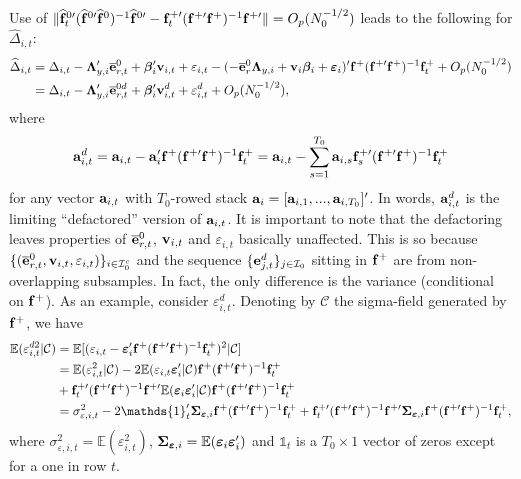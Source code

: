 \documentclass[12pt,fleqn]{article}
\begin{document}
Use of $\|\widehat{\mathbf{f}}_t^{0\prime}(\widehat{\mathbf{f}}^{0\prime}\widehat{\mathbf{f}}^0)^{-1}\widehat{\mathbf{f}}^{0\prime} - \mathbf{f}_t^{+\prime}(\mathbf{f}^{+\prime}\mathbf{f}^+)^{-1}\mathbf{f}^{+\prime}\| = O_p(N_0^{-1/2})$ leads to the following for $\widehat \Delta_{i,t}$:
\begin{align}
\widehat \Delta_{i,t} & = \Delta_{i,t} - \boldsymbol{\Lambda}_{y,i}'\overline{\mathbf{e}}_{r,t}^0 + \boldsymbol{\beta}_i'\mathbf{v}_{i,t} + \varepsilon_{i,t}  - ( - \overline{\mathbf{e}}_{r}^0\boldsymbol{\Lambda}_{y,i} + \mathbf{v}_i\boldsymbol{\beta}_i+  \boldsymbol{\varepsilon}_{i} )'  \mathbf{f}^{+} (\mathbf{f}^{+\prime}\mathbf{f}^+)^{-1}\mathbf{f}_t^+ + O_p(N_0^{-1/2})\notag\\
& = \Delta_{i,t} - \boldsymbol{\Lambda}_{y,i}'\overline{\mathbf{e}}_{r,t}^{0d} + \boldsymbol{\beta}_i'\mathbf{v}_{i,t}^d + \varepsilon_{i,t}^d  + O_p(N_0^{-1/2}),
\end{align}
where
\begin{align}
\mathbf{a}_{i,t}^d = \mathbf{a}_{i,t} - \mathbf{a}_i' \mathbf{f}^{+} (\mathbf{f}^{+\prime}\mathbf{f}^+)^{-1}\mathbf{f}_t^+ = \mathbf{a}_{i,t} - \sum_{s=1}^{T_0} \mathbf{a}_{i,s}\mathbf{f}_s^{+\prime} (\mathbf{f}^{+\prime}\mathbf{f}^+)^{-1}\mathbf{f}_t^+
\end{align}
for any vector $\mathbf{a}_{i,t}$ with $T_0$-rowed stack $\mathbf{a}_i = [\mathbf{a}_{i,1},...,\mathbf{a}_{i,T_0}]'$. In words, $\mathbf{a}_{i,t}^d$ is the limiting ``defactored'' version of $\mathbf{a}_{i,t}$. It is important to note that the defactoring leaves properties of $\overline{\mathbf{e}}_{r,t}^{0}$, $\mathbf{v}_{i,t}$ and $\varepsilon_{i,t}$ basically unaffected. This is so because $\{ (\overline{\mathbf{e}}_{r,t}^{0}, \mathbf{v}_{i,t}, \varepsilon_{i,t}) \}_{i\in \mathcal{I}_0^c}$ and the sequence $\{\mathbf{e}_{j,t}^{d}\}_{j\in \mathcal{I}_0}$ sitting in $\mathbf{f}^+$ are from non-overlapping subsamples. In fact, the only difference is the variance (conditional on $\mathbf{f}^+$). As an example, consider $ \varepsilon_{i,t}^d$. Denoting by $\mathcal{C}$ the sigma-field generated by $\mathbf{f}^+$, we have
\begin{align}
\mathbb{E} (\varepsilon_{i,t}^{d2}|\mathcal{C}) & = \mathbb{E} [(\varepsilon_{i,t}  - \+\varepsilon_i' \*f^{+} (\*f^{+\prime}\*f^+)^{-1}\*f_t^+)^2 |\mathcal{C}] \notag\\
& = \mathbb{E} (\varepsilon_{i,t}^2 |\mathcal{C} ) - 2\mathbb{E} (\varepsilon_{i,t} \+\varepsilon_i'|\mathcal{C}) \*f^{+} (\*f^{+\prime}\*f^+)^{-1}\*f_t^+ \notag\\
&  + \*f_t^{+\prime} (\*f^{+\prime}\*f^+)^{-1}\*f^{+\prime}   \mathbb{E}(\+\varepsilon_i \+\varepsilon_i'|\mathcal{C}) \*f^{+} (\*f^{+\prime}\*f^+)^{-1}\*f_t^+ \notag\\
& = \sigma_{\varepsilon,i,t}^2 - 2 \mathds{1}_t'\+\Sigma_{\+\varepsilon,i} \*f^{+} (\*f^{+\prime}\*f^+)^{-1}\*f_t^+ + \*f_t^{+\prime} (\*f^{+\prime}\*f^+)^{-1}\*f^{+\prime}   \+\Sigma_{\+\varepsilon,i} \*f^{+} (\*f^{+\prime}\*f^+)^{-1}\*f_t^+,
\end{align}
where $\sigma^2_{\varepsilon,i,t}  = \mathbb{E}  (\varepsilon_{i,t}^{2} )$, $\boldsymbol{\Sigma}_{\boldsymbol{\varepsilon},i}  = \mathbb{E}  (\boldsymbol{\varepsilon}_{i}\boldsymbol{\varepsilon}_{i}' )$ and $\mathds{1}_t$ is a $T_0 \times 1$ vector of zeros except for a one in row $t$.
\end{document}
